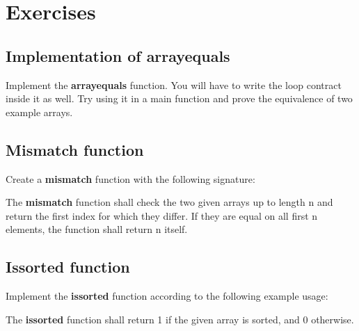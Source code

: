 
\section{Exercises}

\subsection{Implementation of array\textunderscore equals}

Implement the \textbf{array\textunderscore equals} function. You will have to write the loop contract inside it as well. Try using it in a main function and prove the equivalence of two example arrays. 

\subsection{Mismatch function}

Create a \textbf{mismatch} function with the following signature:


The \textbf{mismatch} function shall check the two given arrays up to length n and return the first index for which they differ. If they are equal on all first n elements, the function shall return n itself. 

\subsection{Is\textunderscore sorted function}

Implement the \textbf{is\textunderscore sorted} function according to the following example usage:


The \textbf{is\textunderscore sorted} function shall return 1 if the given array is sorted, and 0 otherwise.
